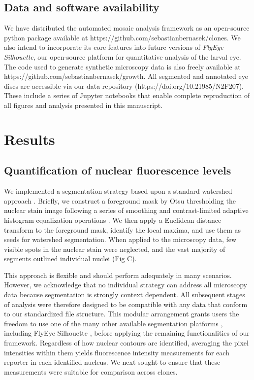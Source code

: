\documentclass[10pt,letterpaper]{article}
\begin{document}
\subsection*{Data and software availability}

We have distributed the automated mosaic analysis framework as an open-source python package available at https://github.com/sebastianbernasek/clones. We also intend to incorporate its core features into future versions of \textit{FlyEye Silhouette}, our open-source platform for quantitative analysis of the larval eye. The code used to generate synthetic microscopy data is also freely available at https://github.com/sebastianbernasek/growth. All segmented and annotated eye discs are accessible via our data repository (https://doi.org/10.21985/N2F207). These include a series of Jupyter notebooks that enable complete reproduction of all figures and analysis presented in this manuscript.



\section*{Results}

\subsection*{Quantification of nuclear fluorescence levels}
\label{ch:segmentation}

We implemented a segmentation strategy based upon a standard watershed approach \cite{VanderWalt2014}. Briefly, we construct a foreground mask by Otsu thresholding the nuclear stain image following a series of smoothing and contrast-limited adaptive histogram equalization operations \cite{NobuyukiOtsu1979,VanderWalt2014}. We then apply a Euclidean distance transform to the foreground mask, identify the local maxima, and use them as seeds for watershed segmentation. When applied to the microscopy data, few visible spots in the nuclear stain were neglected, and the vast majority of segments outlined individual nuclei (Fig C).

This approach is flexible and should perform adequately in many scenarios. However, we acknowledge that no individual strategy can address all microscopy data because segmentation is strongly context dependent. All subsequent stages of analysis were therefore designed to be compatible with any data that conform to our standardized file structure. This modular arrangement grants users the freedom to use one of the many other available segmentation platforms \cite{Bugarski2014}, including FlyEye Silhouette \cite{Pelaez2015a}, before applying the remaining functionalities of our framework. Regardless of how nuclear contours are identified, averaging the pixel intensities within them yields fluorescence intensity measurements for each reporter in each identified nucleus. We next sought to ensure that these measurements were suitable for comparison across clones.
\end{document}
